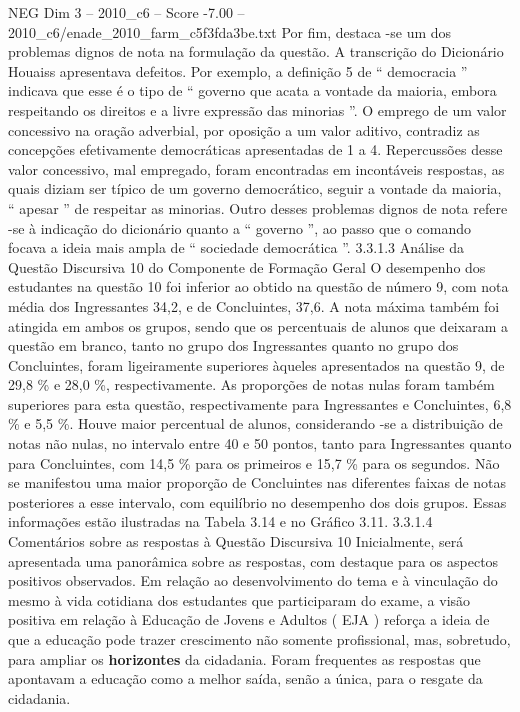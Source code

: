 \begin{textsample}{NEG Dim 3 – 2010\_c6 – Score -7.00 – 2010\_c6/enade\_2010\_farm\_c5f3fda3be.txt}
Por fim, destaca -se um dos problemas dignos de nota na formulação da questão.
A transcrição do Dicionário Houaiss apresentava defeitos.
Por exemplo, a definição 5 de “ democracia ” indicava que esse é o tipo de “ governo que acata a vontade da maioria, embora respeitando os direitos e a livre expressão das minorias ”.
O emprego de um valor concessivo na oração adverbial, por oposição a um valor aditivo, contradiz as concepções efetivamente democráticas apresentadas de 1 a 4.
Repercussões desse valor concessivo, mal empregado, foram encontradas em incontáveis respostas, as quais diziam ser típico de um governo democrático, seguir a vontade da maioria, “ apesar ” de respeitar as minorias.
Outro desses problemas dignos de nota refere -se à indicação do dicionário quanto a “ governo ”, ao passo que o comando focava a ideia mais ampla de “ sociedade democrática ”. 3.3.1.3 Análise da Questão Discursiva 10 do Componente de Formação Geral O desempenho dos estudantes na questão 10 foi inferior ao obtido na questão de número 9, com nota média dos Ingressantes 34,2, e de Concluintes, 37,6.
A nota máxima também foi atingida em ambos os grupos, sendo que os percentuais de alunos que deixaram a questão em branco, tanto no grupo dos Ingressantes quanto no grupo dos Concluintes, foram ligeiramente superiores àqueles apresentados na questão 9, de 29,8 \% e 28,0 \%, respectivamente.
As proporções de notas nulas foram também superiores para esta questão, respectivamente para Ingressantes e Concluintes, 6,8 \% e 5,5 \%.
Houve maior percentual de alunos, considerando -se a distribuição de notas não nulas, no intervalo entre 40 e 50 pontos, tanto para Ingressantes quanto para Concluintes, com 14,5 \% para os primeiros e 15,7 \% para os segundos.
Não se manifestou uma maior proporção de Concluintes nas diferentes faixas de notas posteriores a esse intervalo, com equilíbrio no desempenho dos dois grupos.
Essas informações estão ilustradas na Tabela 3.14 e no Gráfico 3.11. 3.3.1.4 Comentários sobre as respostas à Questão Discursiva 10 Inicialmente, será apresentada uma panorâmica sobre as respostas, com destaque para os aspectos positivos observados.
Em relação ao desenvolvimento do tema e à vinculação do mesmo à vida cotidiana dos estudantes que participaram do exame, a visão positiva em relação à Educação de Jovens e Adultos ( EJA ) reforça a ideia de que a educação pode trazer crescimento não somente profissional, mas, sobretudo, para ampliar os \textbf{horizontes} da cidadania.
Foram frequentes as respostas que apontavam a educação como a melhor saída, senão a única, para o resgate da cidadania.

\end{textsample}

